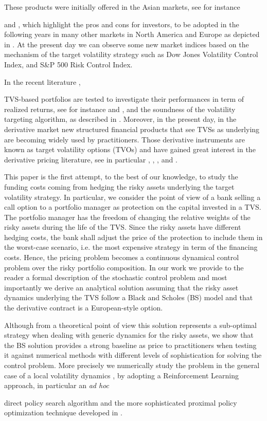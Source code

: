 \documentclass[runningheads]{m2ef}
\newcommand\soutpars[1]{\let\helpcmd\sout\parhelp#1\par\relax\relax}
\newcommand{\change}[1]{{\color{red} {#1}}}%
\newcommand{\remove}[1]{{\color{red} \soutpars{{#1}}}}%
\begin{document}
These products were initially offered in the Asian markets, see for instance \remove{the reports of} \cite{Chew2011} and \cite{Xue2012}, which highlight the pros and cons for investors, to be adopted in the following years in many other markets in North America and Europe as depicted in \cite{Morrison2013}. At the present day we can observe some new market indices based on the mechanism of the target volatility strategy such as Dow Jones Volatility Control Index, and S\&P 500 Risk Control Index.

In the recent literature\change{,} \remove{TVSs} \change{TVS-based portfolios} are tested to investigate their performances in term of realized returns, see for instance \cite{Hocquard2013} and \cite{Perchet2016}, and the soundness of the volatility targeting algorithm, as described in \cite{Kim2018}. Moreover, in the present day, in the derivative market new structured financial products that see TVSs as underlying are becoming widely used by practitioners. Those derivative instruments are known as target volatility options (TVOs) and have gained great interest in the derivative pricing literature, see in particular \cite{Albeverio2019}, \cite{DiGraziano2012}, \cite{DiPersio2019}, and \cite{Grasselli2016}. 

This paper is the first attempt, to the best of our knowledge, to study the funding costs coming from hedging the risky assets underlying the target volatility strategy. In particular, we consider the point of view of a bank selling a call option to a portfolio manager as protection on the capital invested in a TVS. The portfolio manager has the freedom of changing the relative weights of the risky assets during the life of the TVS. Since the risky assets have different hedging costs, the bank shall adjust the price of the protection to include them in the worst-case scenario, i.e. the most expensive strategy in term of the financing costs. Hence, the pricing problem becomes a continuous dynamical control problem over the risky portfolio composition. In our work we provide to the reader a formal description of the stochastic control problem and most importantly we derive an analytical solution assuming that the risky asset dynamics underlying the TVS  follow a Black and Scholes (BS) model \cite{BlackScholes1973} and that the derivative contract is a European-style option. 

Although from a theoretical point of view this solution represents a sub-optimal strategy when dealing with generic dynamics for the risky assets, we show that the BS solution provides a strong baseline as price to practitioners when testing it against numerical methods with different levels of sophistication for solving the control problem. More precisely we numerically study the problem in the general case of a local volatility dynamics \cite{Derman1994}, \cite{Dupire1994}  by adopting a Reinforcement Learning approach, in particular an \textit{ad hoc} \remove{vanilla} direct policy \change{search} algorithm and the more sophisticated proximal policy optimization technique developed in \cite{Schulman2017}. 
\\
\end{document}
